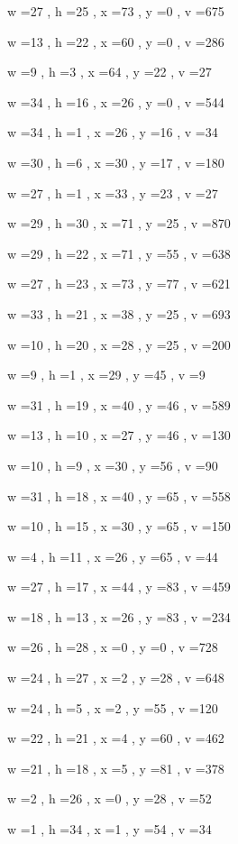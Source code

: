 \documentclass[11pt]{article}
\begin{document}
w =27 , h =25 , x =73 , y =0 , v =675
\par
w =13 , h =22 , x =60 , y =0 , v =286
\par
w =9 , h =3 , x =64 , y =22 , v =27
\par
w =34 , h =16 , x =26 , y =0 , v =544
\par
w =34 , h =1 , x =26 , y =16 , v =34
\par
w =30 , h =6 , x =30 , y =17 , v =180
\par
w =27 , h =1 , x =33 , y =23 , v =27
\par
w =29 , h =30 , x =71 , y =25 , v =870
\par
w =29 , h =22 , x =71 , y =55 , v =638
\par
w =27 , h =23 , x =73 , y =77 , v =621
\par
w =33 , h =21 , x =38 , y =25 , v =693
\par
w =10 , h =20 , x =28 , y =25 , v =200
\par
w =9 , h =1 , x =29 , y =45 , v =9
\par
w =31 , h =19 , x =40 , y =46 , v =589
\par
w =13 , h =10 , x =27 , y =46 , v =130
\par
w =10 , h =9 , x =30 , y =56 , v =90
\par
w =31 , h =18 , x =40 , y =65 , v =558
\par
w =10 , h =15 , x =30 , y =65 , v =150
\par
w =4 , h =11 , x =26 , y =65 , v =44
\par
w =27 , h =17 , x =44 , y =83 , v =459
\par
w =18 , h =13 , x =26 , y =83 , v =234
\par
w =26 , h =28 , x =0 , y =0 , v =728
\par
w =24 , h =27 , x =2 , y =28 , v =648
\par
w =24 , h =5 , x =2 , y =55 , v =120
\par
w =22 , h =21 , x =4 , y =60 , v =462
\par
w =21 , h =18 , x =5 , y =81 , v =378
\par
w =2 , h =26 , x =0 , y =28 , v =52
\par
w =1 , h =34 , x =1 , y =54 , v =34
\par
\newpage
\end{document}
